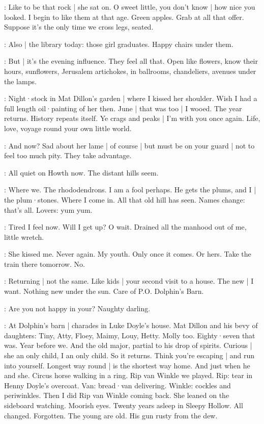 \BloomCurrent:
Like to be that rock |
she sat on.
O sweet little,
you don't know |
how nice you looked.
I begin to like them at that age.
Green apples.
Grab at all that offer.
Suppose it's the only time we cross legs,
seated.

\BloomToday:
Also |
the library today:
those girl graduates.
Happy chairs under them.

\BloomAbstract:
But |
it's the evening influence.
They feel all that.
Open like flowers,
know their hours,
sunflowers,
Jerusalem artichokes,
in ballrooms,
chandeliers,
avenues under the lamps.%

\BloomHist:
Night·stock in Mat Dillon's garden |
where I kissed her shoulder.
Wish I had a full length oil·painting of her then.
June |
that was too |
I wooed.
The year returns.
History repeats itself.
Ye crags and peaks |
I'm with you once again.
Life,
love,
voyage round your own little world.

\BloomCurrent:
And now?
Sad about her lame |
of course |
but must be on your guard |
not to feel too much pity.
They take advantage.

\BloomCurrent:
All quiet on Howth now.
The distant hills seem.

\BloomHist:
Where we.
The rhododendrons.
I am a fool perhaps.
He gets the plums,
and I |
the plum·stones.
Where I come in.
All that old hill has seen.
Names change:
that's all.%
Lovers:
yum yum.

\BloomCurrent:
Tired I feel now.
Will I get up?
O wait.
Drained all the manhood out of me,
little wretch.

\BloomHist:
She kissed me.
Never again.
My youth.
Only once it comes.
Or hers.
Take the train there tomorrow.
No.

\BloomAbstract:
Returning |
not the same.
Like kids |
your second visit to a house.
The new |
I want.
Nothing new under the sun.
Care of P.O. Dolphin's Barn.

\BloomToday:
Are you not happy in your?
Naughty darling.

\BloomHist:
At Dolphin's barn |
charades in Luke Doyle's house.
Mat Dillon and his bevy of daughters:
Tiny,
Atty,
Floey,
Maimy,
Louy,
Hetty.
Molly too.
Eighty·seven that was.
Year before we.
And the old major,
partial to his drop of spirits.
Curious |
she an only child,
I an only child.
So it returns.
Think you're escaping |
and run into yourself.%
Longest way round |
is the shortest way home.
And just when he and she.
Circus horse
walking in a ring.
Rip van Winkle
we played.
Rip: tear in Henny Doyle's overcoat.
Van: bread·van delivering.
Winkle: cockles and periwinkles.
Then I did Rip van Winkle coming back.
She leaned on the sideboard watching.
Moorish eyes.
Twenty years asleep in Sleepy Hollow.
All changed.
Forgotten.
The young are old.
His gun rusty from the dew.

